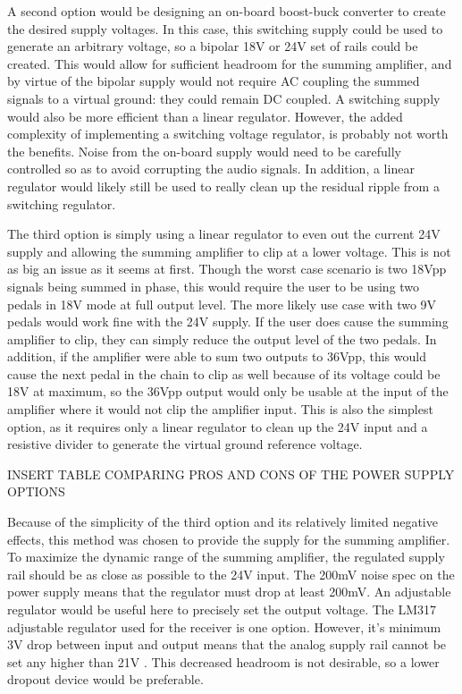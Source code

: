 \documentclass{article}
\begin{document}
	A second option would be designing an on-board boost-buck converter to create the desired supply voltages.  In this case, this switching supply could be used to generate an arbitrary voltage, so a bipolar 18V or 24V set of rails could be created.  This would allow for sufficient headroom for the summing amplifier, and by virtue of the bipolar supply would not require AC coupling the summed signals to a virtual ground: they could remain DC coupled.  A switching supply would also be more efficient than a linear regulator.  However, the added complexity of implementing a switching voltage regulator, is probably not worth the benefits.  Noise from the on-board supply would need to be carefully controlled so as to avoid corrupting the audio signals.  In addition, a linear regulator would likely still be used to really clean up the residual ripple from a switching regulator.

	The third option is simply using a linear regulator to even out the current 24V supply and allowing the summing amplifier to clip at a lower voltage.  This is not as big an issue as it seems at first.  Though the worst case scenario is two 18Vpp signals being summed in phase, this would require the user to be using two pedals in 18V mode at full output level.  The more likely use case with two 9V pedals would work fine with the 24V supply.  If the user does cause the summing amplifier to clip, they can simply reduce the output level of the two pedals.  In addition, if the amplifier were able to sum two outputs to 36Vpp, this would cause the next pedal in the chain to clip as well because of its voltage could be 18V at maximum, so the 36Vpp output would only be usable at the input of the amplifier where it would not clip the amplifier input.  This is also the simplest option, as it requires only a linear regulator to clean up the 24V input and a resistive divider to generate the virtual ground reference voltage.  

	INSERT TABLE COMPARING PROS AND CONS OF THE POWER SUPPLY OPTIONS

	Because of the simplicity of the third option and its relatively limited negative effects, this method was chosen to provide the supply for the summing amplifier.  To maximize the dynamic range of the summing amplifier, the regulated supply rail should be as close as possible to the 24V input.  The 200mV noise spec on the power supply means that the regulator must drop at least 200mV.  An adjustable regulator would be useful here to precisely set the output voltage.  The LM317 adjustable regulator used for the receiver is one option.  However, it's minimum 3V drop between input and output means that the analog supply rail cannot be set any higher than 21V \cite{atasheet:LM317}.  This decreased headroom is not desirable, so a lower dropout device would be preferable.
\end{document}
